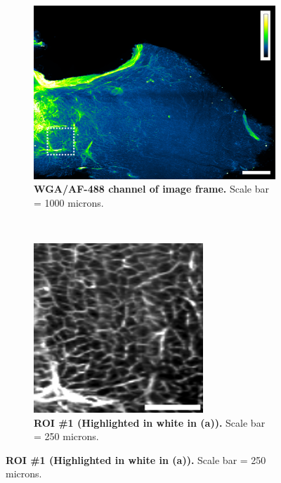 \begin{figure}[H]
    \begin{subfigure}[t]{0.5\textwidth}
    \includegraphics[width=1\linewidth]{Images/wga_channel.png}
    \caption{\textbf{WGA/AF-488 channel of image frame.} Scale bar = 1000 microns.}
    \end{subfigure}
    \medskip
    ~
    \begin{subfigure}[t]{0.45\textwidth}
    \centering
    \includegraphics[width=0.8\linewidth]{Images/wga_zoomin.png}
    \caption{\textbf{ROI \#1 (Highlighted in white in (a)).} Scale bar = 250 microns.}
    \end{subfigure}
    \medskip
    

\end{figure}
